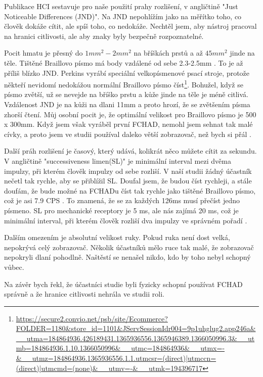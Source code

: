 Publikace HCI sestavuje pro naše použití prahy rozlišení, v angličtině "Just Noticeable Differences (JND)". Na JND nepohlížím jako na měřítko toho, co člověk dokáže cítit, ale spíš toho, co nedokáže.  Nechtěl jsem, aby nástroj pracoval na hranici citlivosti, ale aby znaky byly bezpečně rozpoznatelné.

Pocit hmatu je přesný do ${}1mm^2 - 2mm^2$ na bříškách prstů a až ${}45mm^2$ jinde na těle.  Tištěné Braillovo písmo má body vzdálené od sebe 2.3-2.5mm \citep{brailleauthority}. To je až příliš blízko JND.  Perkins vyrábí speciální velkopísmenové psací stroje, protože někteří nevidomí nedokážou normální Braillovo písmo číst\footnote{\url{https://secure2.convio.net/psb/site/Ecommerce?FOLDER=1180&store_id=1101&JServSessionIdr004=9p1uhglug2.app246a&__utma=184864936.426189431.1365936556.1365946389.1366050996.3&__utmb=184864936.1.10.1366050996&__utmc=184864936&__utmx=-&__utmz=184864936.1365936556.1.1.utmcsr=(direct)|utmccn=(direct)|utmcmd=(none)&__utmv=-&__utmk=194396717}}.  Bohužel, když se písmo zvětší, už se nevejde na bříško prstu a kůže jinde na těle je méně citlivá.  Vzdálenost JND je na kůži na dlani 11mm a proto hrozí, že se zvětšením písma zhorší čtení. Můj osobní pocit je, že optimální velikost pro Braillovo písmo je 500 x 300mm.  Když jsem však vyráběl první FCHAD, nemohl jsem sehnat tak malé cívky, a proto jsem ve studii používal daleko větší zobrazovač, než bych si přál \citep[str. 30-32]{nielsen2008gesture}.

Další práh rozlišení je časový, který udává, kolikrát něco můžete cítit za sekundu.  V angličtině "successiveness limen(SL)" je minimální interval mezi dvěma impulzy, při kterém člověk impulzy od sebe rozliší. V naší studii žádný účastník nečetl tak rychle, aby se přiblížil SL.  Doufal jsem, že budou číst rychleji, a stále doufám, že bude možné na FCHADu číst tak rychle jako tištěné Braillovo písmo, což je asi 7.9 CPS \citep{wetzel2006studies}.  To znamená, že se za každých 126ms musí přečíst jedno písmeno.  SL pro mechanické receptory je 5 ms, ale nás zajímá 20 ms, což je minimální interval, při kterém člověk rozliší dva impulzy ve správném pořadí \citep[str. 32]{nielsen2008gesture}.

Dalším omezením je absolutní velikost ruky.  Pokud ruka není dost velká, nepokrývá celý zobrazovač.  Několik účastníků mělo ruce tak malé, že zobrazovač nepokryli dlaní pohodlně. Naštěstí se nenašel nikdo, kdo by toho nebyl schopný vůbec.

Na závěr bych řekl, že účastníci studie byli fyzicky schopní používat FCHAD správně a že hranice citlivosti nehrála ve studii roli.

